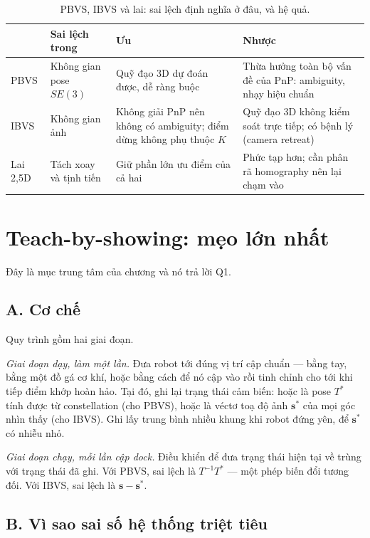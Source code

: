 \documentclass[../../marker.tex]{subfiles}
\begin{document}
\begin{table}[H]\centering\small
\caption{PBVS, IBVS và lai: sai lệch định nghĩa ở đâu, và hệ quả.}
\label{tab:b13-ho}
\begin{tabularx}{\linewidth}{@{}L{1.8cm}L{2.8cm}L{3.4cm}Y@{}}
\toprule
& \textbf{Sai lệch trong} & \textbf{Ưu} & \textbf{Nhược}\\
\midrule
PBVS & Không gian pose \(SE(3)\) & Quỹ đạo 3D dự đoán được, dễ ràng buộc & Thừa hưởng toàn bộ vấn đề của PnP: ambiguity, nhạy hiệu chuẩn\\
IBVS & Không gian ảnh & Không giải PnP nên không có ambiguity; điểm dừng không phụ thuộc \(K\) \cite{espiau1992new} & Quỹ đạo 3D không kiểm soát trực tiếp; có bệnh lý (camera retreat)\\
Lai 2,5D & Tách xoay và tịnh tiến \cite{malis1999twohalf} & Giữ phần lớn ưu điểm của cả hai & Phức tạp hơn; cần phân rã homography nên lại chạm vào \\
\bottomrule
\end{tabularx}
\end{table}

\section{Teach-by-showing: mẹo lớn nhất}

Đây là mục trung tâm của chương và nó trả lời Q1.

\subsection{A. Cơ chế}

Quy trình gồm hai giai đoạn.

\emph{Giai đoạn dạy, làm một lần.} Đưa robot tới đúng vị trí cập chuẩn --- bằng tay, bằng một đồ gá cơ khí, hoặc bằng cách để nó cập vào rồi tinh chỉnh cho tới khi tiếp điểm khớp hoàn hảo. Tại đó, ghi lại trạng thái cảm biến: hoặc là pose \(T^*\) tính được từ constellation (cho PBVS), hoặc là véctơ toạ độ ảnh \(\mathbf{s}^*\) của mọi góc nhìn thấy (cho IBVS). Ghi lấy trung bình nhiều khung khi robot đứng yên, để \(\mathbf{s}^*\) có nhiễu nhỏ.

\emph{Giai đoạn chạy, mỗi lần cập dock.} Điều khiển để đưa trạng thái hiện tại về trùng với trạng thái đã ghi. Với PBVS, sai lệch là \(T^{-1}T^*\) --- một phép biến đổi tương đối. Với IBVS, sai lệch là \(\mathbf{s} - \mathbf{s}^*\).

\subsection{B. Vì sao sai số hệ thống triệt tiêu}
\end{document}
